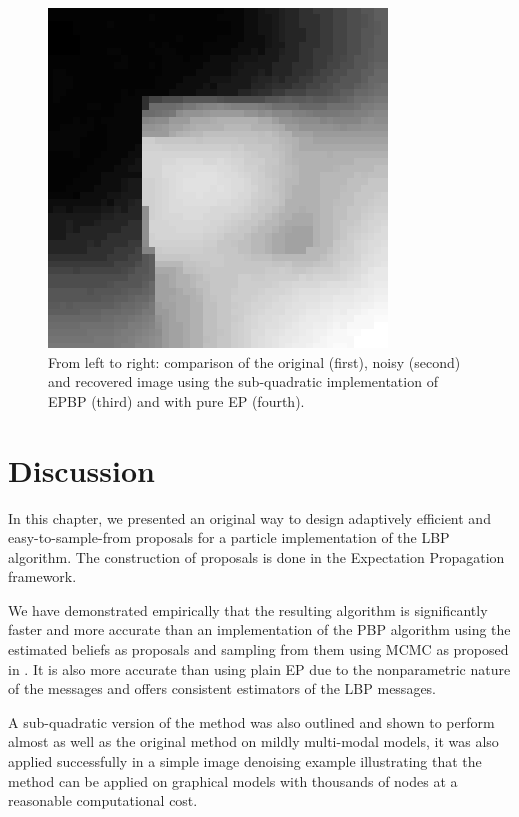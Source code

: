\begin{figure}[!h]
\hspace*{.3cm}
\includegraphics[scale=.28]{figures/epbp/denoisingEP2}
\caption{\label{figIMG} From left to right: comparison of the original (first), noisy (second) and recovered image using the sub-quadratic implementation of EPBP (third) and with pure EP (fourth). %
}
\end{figure}


\section{Discussion}

In this chapter, we presented an original way to design adaptively efficient and easy-to-sample-from proposals for a particle implementation of the LBP algorithm. The construction of proposals is done in the Expectation Propagation framework.

We have demonstrated empirically that the resulting algorithm is significantly faster and more accurate than an implementation of the PBP algorithm using the estimated beliefs as proposals and sampling from them using MCMC as proposed in \cite{ihler09}. 
It is also more accurate than using plain EP due to the nonparametric nature of the messages and offers consistent estimators of the LBP messages. 

A sub-quadratic version of the method was also outlined and shown to perform almost as well as the original method on mildly multi-modal models, it was also applied successfully in a simple image denoising example illustrating that the method can be applied on graphical models with thousands of nodes at a reasonable computational cost.

